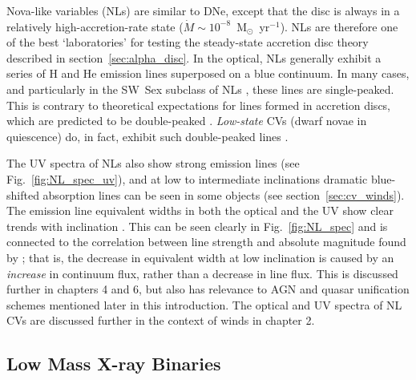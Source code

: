 Nova-like variables (NLs) are similar to DNe,
except that the disc is always in a relatively 
high-accretion-rate state ($\dot{M} \sim 10^{-8}$~M$_{\odot}$~yr$^{-1}$).
NLs are therefore one of the best `laboratories' for testing the steady-state
accretion disc theory described in section~\ref{sec:alpha_disc}.
In the optical, NLs generally exhibit a series of H and He emission 
lines superposed on a blue continuum. In many
cases, and particularly in the SW~Sex subclass of NLs
\citep{HSK86,DR95}, these lines are single-peaked. This is contrary to
theoretical expectations for lines formed in accretion discs, which
are predicted to be double-peaked \citep{smak1981, hornemarsh1986}. 
{\em Low-state} CVs (dwarf novae in quiescence) do, in fact,
exhibit such double-peaked lines \citep{marshhorne1990}. 

\nocite{dhillon1996,hessman1984}


The UV spectra of NLs also show strong emission lines (see Fig.~\ref{fig:NL_spec_uv}), and at 
low to intermediate inclinations dramatic blue-shifted absorption lines
can be seen in some objects (see section~\ref{sec:cv_winds}). The emission line equivalent widths
in both the optical and the UV show clear trends with 
inclination \citep{hessman1984,echevarria1988,noebauer}. 
This can be seen clearly in Fig.~\ref{fig:NL_spec} and is connected to
the correlation between line strength and absolute magnitude 
found by \cite{patterson1984};
that is, the decrease in equivalent width at low inclination is caused by an {\em increase} in continuum flux, rather than a decrease in line flux. 
This is discussed further in chapters 4 and 6, but also has 
relevance to AGN and quasar unification schemes mentioned later in this introduction.
The optical and UV spectra of NL CVs are discussed further
in the context of winds in chapter 2.

\subsection{Low Mass X-ray Binaries}

